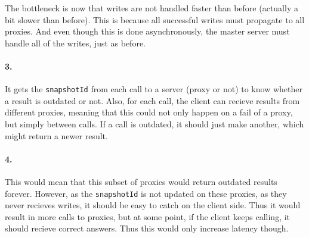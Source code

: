\documentclass[a4paper, 11pt]{article}
\begin{document}
The bottleneck is now that writes are not handled faster than before (actually a bit slower than before). This is because all successful writes must propagate to all proxies. And even though this is done asynchronously, the master server must handle all of the writes, just as before. 

\paragraph{3.}
It gets the \texttt{snapshotId} from each call to a server (proxy or not) to know whether a result is outdated or not. Also, for each call, the client can recieve results from different proxies, meaning that this could not only happen on a fail of a proxy, but simply between calls. If a call is outdated, it should just make another, which might return a newer result. %

\paragraph{4.}
This would mean that this subset of proxies would return outdated results forever. However, as the \texttt{snapshotId} is not updated on these proxies, as they never recieves writes, it should be easy to catch on the client side. Thus it would result in more calls to proxies, but at some point, if the client keeps calling, it should recieve correct answers. Thus this would only increase latency though.
\end{document}
